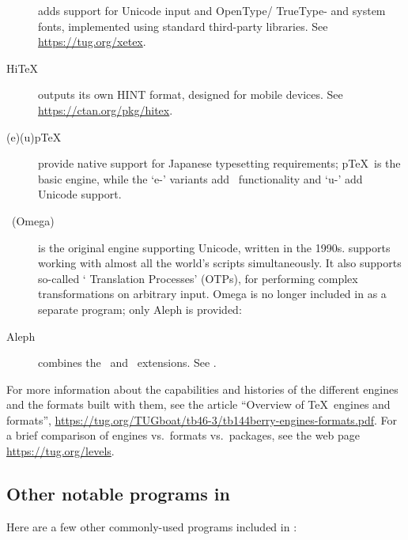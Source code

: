 \documentclass[12pt]{article}
\begin{document}
\begin{description}
\item [\XeTeX] adds support for Unicode input and OpenType\slash
TrueType- and system fonts, implemented using standard third-party
libraries. See \url{https://tug.org/xetex}.

\item [Hi\TeX] outputs its own HINT format, designed for mobile devices.
See \url{https://ctan.org/pkg/hitex}.

\item [(e)(u)p\TeX] provide native support for Japanese typesetting
requirements; p\TeX\ is the basic engine, while the `e-' variants add
\eTeX\ functionality and `u-' add Unicode support.

\item [\OMEGA\ (Omega)] is the original engine supporting Unicode,
written in the 1990s. supports working with almost all the world's
scripts simultaneously. It also supports so-called `\OMEGA{} Translation
Processes' (OTPs), for performing complex transformations on arbitrary
input. Omega is no longer included in \TL{} as a separate program; only
Aleph is provided:

\item [Aleph] combines the \OMEGA\ and \eTeX\ extensions.
See .

\end{description}

For more information about the capabilities and histories of the
different engines and the formats built with them, see the article
``Overview of \TeX\ engines and formats'',
\url{https://tug.org/TUGboat/tb46-3/tb144berry-engines-formats.pdf}.
For a brief comparison of engines vs.\ formats vs.\ packages, see the
web page \url{https://tug.org/levels}.

\subsection{Other notable programs in \protect\TL}

Here are a few other commonly-used programs included in \TL{}:
\end{document}
